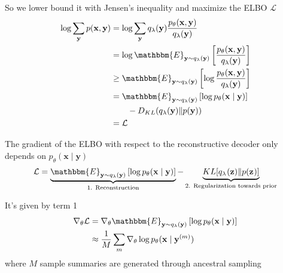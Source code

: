 \documentclass{beamer}
\let\tempone\itemize
\let\temptwo\enditemize
\renewenvironment{itemize}{\tempone\addtolength{\itemsep}{0.5\baselineskip}}{\temptwo}
\newcommand{\zvec}{\mathbf{z}}
\newcommand{\E}[2]{\mathbbm{E}_{#1}\left[#2\right]}
\newcommand{\bx}{\mathbf{x}}
\newcommand{\by}{\mathbf{y}}
\begin{document}
\begin{frame}
\begin{center}
\end{center}
\begin{itemize}
\item So we lower bound it with Jensen's inequality and maximize the ELBO $\mathcal{L}$
\begin{align}
\log\sum_\by p(\bx, \by) &= \log\sum_\by q_\lambda(\by) \frac{p_\theta(\bx, \by)}{q_\lambda(\by)}\\
&= \log \E{\by\sim q_\lambda(\by)}{\frac{p_\theta(\bx, \by)}{q_\lambda(\by)}}\\
&\geq \E{\by\sim q_\lambda(\by)}{\log\frac{p_\theta(\bx, \by)}{q_\lambda(\by)}}\\
&= \E{\by\sim q_\lambda(\by)}{\log p_\theta(\bx\mid\by)} \\
&\qquad - D_{KL}(q_\lambda(\by) \Vert p(\by))\nonumber\\
&= \mathcal{L} \nonumber
\end{align}
\end{itemize}
\end{frame}

\begin{frame}
\begin{center}
\end{center}
\begin{itemize}
\item The gradient of the ELBO with respect to the reconstructive decoder only
depends on $p_\theta(\bx\mid\by)$
\begin{equation*}
\mathcal{L} = \underbrace{
        \E{\by\sim q_\lambda(\by)}{\log  p_\theta(\bx \mid \by)}
}_{\text{1. Reconstruction}} - \underbrace{
        KL[q_{\lambda^{}}(\zvec) \Vert p(\zvec^{})]
}_{\text{2. Regularization towards prior}}
\end{equation*}
\item It's given by term 1
\begin{align}
\nabla_\theta \mathcal{L} &=
\nabla_\theta \E{\by\sim q_\lambda(\by)}{\log  p_\theta(\bx \mid \by)}\\
&\approx \frac{1}{M}\sum_m \nabla_\theta\log p_\theta(\bx\mid\by^{(m)})
\end{align}
where $M$ sample summaries are generated through ancestral sampling
\end{itemize}
\end{frame}
\end{document}
